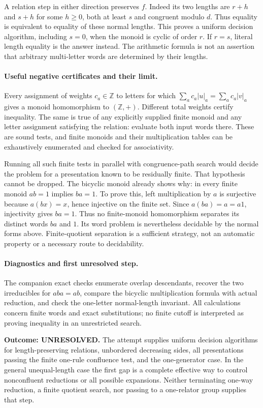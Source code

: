 \documentclass[11pt]{article}
\begin{document}
A relation step in either direction preserves $f$. Indeed its two
lengths are $r+h$ and $s+h$ for some $h\ge0$, both at least $s$ and
congruent modulo $d$. Thus equality is equivalent to equality of these
normal lengths. This proves a uniform decision algorithm, including
$s=0$, when the monoid is cyclic of order $r$. If $r=s$, literal
length equality is the answer instead. The arithmetic formula is not
an assertion that arbitrary multi-letter words are determined by their
lengths.

\paragraph{Useful negative certificates and their limit.}
Every assignment of weights $c_a\in\mathbb Z$ to letters for which
$\sum_a c_a|u|_a=\sum_a c_a|v|_a$ gives a monoid homomorphism to
$(\mathbb Z,+)$. Different total weights certify inequality. The same
is true of any explicitly supplied finite monoid and any letter
assignment satisfying the relation: evaluate both input words there.
These are sound tests, and finite monoids and their multiplication
tables can be exhaustively enumerated and checked for associativity.

Running all such finite tests in parallel with congruence-path search
would decide the problem for a presentation known to be residually
finite. That hypothesis cannot be dropped. The bicyclic monoid already
shows why: in every finite monoid $ab=1$ implies $ba=1$. To prove this,
left multiplication by $a$ is surjective because $a(bx)=x$, hence
injective on the finite set. Since $a(ba)=a=a1$, injectivity gives
$ba=1$. Thus no finite-monoid homomorphism separates its distinct
words $ba$ and $1$. Its word problem is nevertheless decidable by the
normal forms above. Finite-quotient separation is a sufficient strategy,
not an automatic property or a necessary route to decidability.

\paragraph{Diagnostics and first unresolved step.}
The companion exact checks enumerate overlap descendants, recover the
two irreducibles for $aba=ab$, compare the bicyclic multiplication formula
with actual reduction, and check the one-letter normal-length invariant.
All calculations concern finite words and exact substitutions; no finite
cutoff is interpreted as proving inequality in an unrestricted search.

\textbf{Outcome: UNRESOLVED.} The attempt supplies uniform decision
algorithms for length-preserving relations, unbordered decreasing sides,
all presentations passing the finite one-rule confluence test, and the
one-generator case. In the general unequal-length case the first gap
is a complete effective way to control nonconfluent reductions or all
possible expansions. Neither terminating one-way reduction, a finite
quotient search, nor passing to a one-relator group supplies that step.
\end{document}
